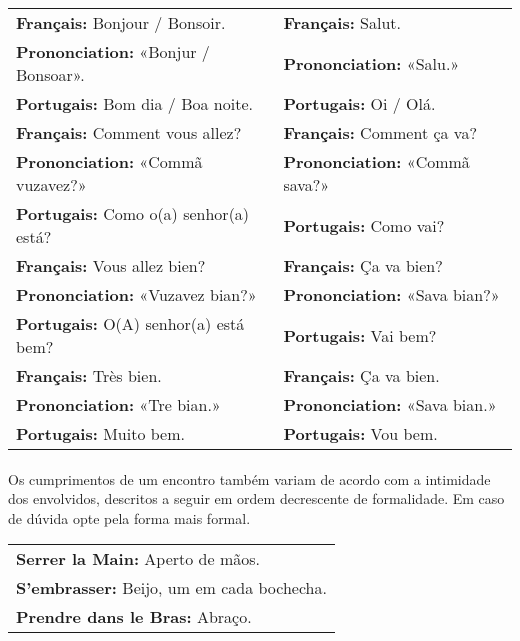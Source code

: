 \documentclass{article}
\begin{document}
        \begin{center}
            \begin{tabular}{m{8cm} m{8cm}}
                \textbf{Français:}      Bonjour / Bonsoir.   & \textbf{Français:}      Salut.\\
                \textbf{Prononciation:} «Bonjur / Bonsoar».  & \textbf{Prononciation:} «Salu.»\\
                \textbf{Portugais:}     Bom dia / Boa noite. & \textbf{Portugais:}     Oi / Olá.\\[2.5ex]
                
                \textbf{Français:}      Comment vous allez?       & \textbf{Français:}      Comment ça va?\\
                \textbf{Prononciation:} «Commã vuzavez?»          & \textbf{Prononciation:} «Commã sava?»\\
                \textbf{Portugais:}     Como o(a) senhor(a) está? & \textbf{Portugais:}     Como vai?\\[2.5ex]

                \textbf{Français:}      Vous allez bien?         & \textbf{Français:}      Ça va bien?\\
                \textbf{Prononciation:} «Vuzavez bian?»          & \textbf{Prononciation:} «Sava bian?»\\
                \textbf{Portugais:}     O(A) senhor(a) está bem? & \textbf{Portugais:}     Vai bem?\\[2.5ex]

                \textbf{Français:}      Très bien.  & \textbf{Français:}      Ça va bien.\\
                \textbf{Prononciation:} «Tre bian.» & \textbf{Prononciation:} «Sava bian.»\\
                \textbf{Portugais:}     Muito bem.  & \textbf{Portugais:}     Vou bem.\\
            \end{tabular}
        \end{center}

    \paragraph{}Os cumprimentos de um encontro também variam de acordo com a intimidade dos envolvidos, descritos a seguir em ordem decrescente de formalidade. Em caso de dúvida opte pela forma mais formal.
        
        \begin{center}
            \begin{tabular}{l}
                \textbf{Serrer la Main:}       Aperto de mãos.\\
                \textbf{S'embrasser:}          Beijo, um em cada bochecha.\\
                \textbf{Prendre dans le Bras:} Abraço.\\
            \end{tabular}
        \end{center}     
    
\end{document}
